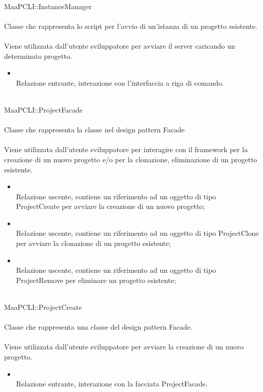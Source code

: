 \\
MaaPCLI::InstanceManager\\
\\
Classe che rappresenta lo script per l'avvio di un'istanza di un progetto esistente.\\
\\
Viene utilizzata dall'utente sviluppatore per avviare il server caricando un determinato progetto.\\
\begin{itemize}
\item{}\\
Relazione entrante, interazione con l'interfaccia a riga di comando.
\end{itemize}

\\
MaaPCLI::ProjectFacade\\
\\
Classe che rappresenta la classe  nel design pattern Facade\\
\\
Viene utilizzata dall'utente sviluppatore per interagire con il framework per la creazione di un nuovo progetto e/o per la clonazione, eliminazione di un progetto esistente.\\
\begin{itemize}
\item{}\\
Relazione uscente, contiene un riferimento ad un oggetto di tipo ProjectCreate per avviare la creazione di un nuovo progetto;
\item{}\\
Relazione uscente, contiene un riferimento ad un oggetto di tipo ProjectClone per avviare la clonazione di un progetto esistente;
\item{}\\
Relazione uscente, contiene un riferimento ad un oggetto di tipo ProjectRemove per eliminare un progetto esistente;
\end{itemize}

\\
MaaPCLI::ProjectCreate\\
\\
Classe che rappresenta una classe del design pattern Facade.\\
\\
Viene utilizzata dall'utente sviluppatore per avviare la creazione di un nuovo progetto.\\
\begin{itemize}
\item{}\\
Relazione entrante, interazione con la facciata ProjectFacade.
\end{itemize}

